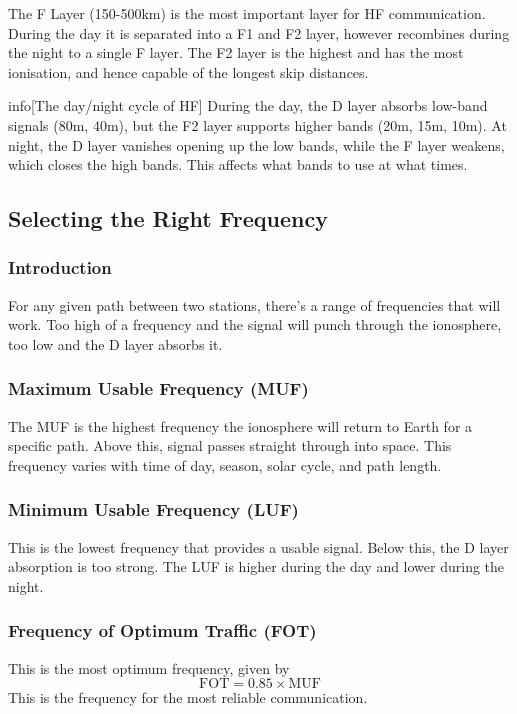 \documentclass{article}
\begin{document}
The F Layer (150-500km) is the most important layer for HF communication. During the day it is separated into a F1 and F2 layer, however recombines during the night to a single F layer. The F2 layer is the highest and has the most ionisation, and hence capable of the longest skip distances.

\begin{callout}{info}[The day/night cycle of HF]
    During the day, the D layer absorbs low-band signals (80m, 40m), but the F2 layer supports higher bands (20m, 15m, 10m). At night, the D layer vanishes opening up the low bands, while the F layer weakens, which closes the high bands. This affects what bands to use at what times.
\end{callout}

\subsection{Selecting the Right Frequency}
\subsubsection{Introduction}
For any given path between two stations, there's a range of frequencies that will work. Too high of a frequency and the signal will punch through the ionosphere, too low and the D layer absorbs it.

\subsubsection{Maximum Usable Frequency (MUF)}
The MUF is the highest frequency the ionosphere will return to Earth for a specific path. Above this, signal passes straight through into space. This frequency varies with time of day, season, solar cycle, and path length.

\subsubsection{Minimum Usable Frequency (LUF)}
This is the lowest frequency that provides a usable signal. Below this, the D layer absorption is too strong. The LUF is higher during the day and lower during the night.

\subsubsection{Frequency of Optimum Traffic (FOT)}
This is the most optimum frequency, given by
\[
    \text{FOT}=0.85\times \text{MUF}
\]
This is the frequency for the most reliable communication.
\end{document}
